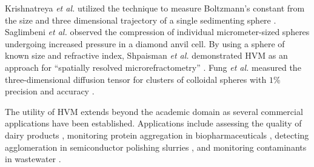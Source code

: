 Krishnatreya \emph{et al.} utilized the technique to measure Boltzmann's constant from the
size and three dimensional trajectory of a single sedimenting sphere \cite{krishnatreya14}.
Saglimbeni \emph{et al.} observed the compression of individual micrometer-sized
spheres
undergoing increased pressure in a diamond anvil cell\cite{saglimbeni16}. By using a sphere
of known size and refractive index, Shpaisman \emph{et al.} demonstrated HVM as an
approach for ``spatially resolved microrefractometry'' \cite{shpaisman12}.
Fung \emph{et al.} measured the three-dimensional diffusion tensor for
clusters of colloidal spheres with $\num{1}$\% precision and accuracy \cite{fung13}.

The utility of HVM extends beyond the academic domain as several commercial
applications have been established. Applications include assessing the quality of dairy
products \cite{cheong09a}, monitoring protein aggregation in biopharmaceuticals \cite{wang16}, detecting agglomeration in semiconductor polishing slurries \cite{cheong17}, 
and monitoring contaminants in wastewater \cite{philips17}.
%
%
%
%

%
